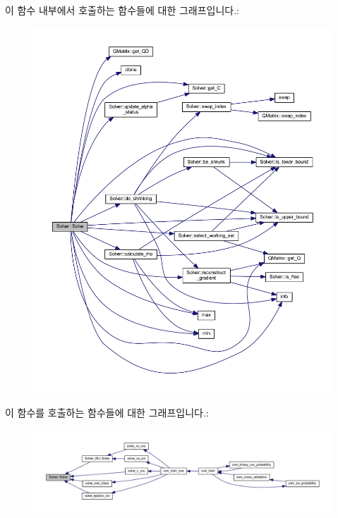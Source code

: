 이 함수 내부에서 호출하는 함수들에 대한 그래프입니다.\+:
\nopagebreak
\begin{figure}[H]
\begin{center}
\leavevmode
\includegraphics[width=350pt]{class_solver_aa3ab5672a26826f9dc1ac9145620a823_cgraph}
\end{center}
\end{figure}




이 함수를 호출하는 함수들에 대한 그래프입니다.\+:
\nopagebreak
\begin{figure}[H]
\begin{center}
\leavevmode
\includegraphics[width=350pt]{class_solver_aa3ab5672a26826f9dc1ac9145620a823_icgraph}
\end{center}
\end{figure}


